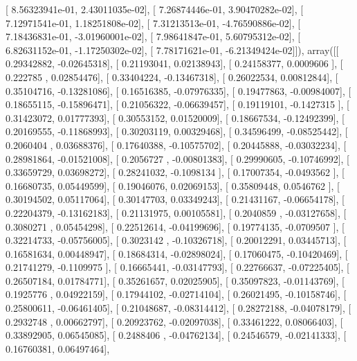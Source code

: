 \documentclass{article}
\begin{document}
       [  8.56323941e-01,   2.43011035e-02],
       [  7.26874446e-01,   3.90470282e-02],
       [  7.12971541e-01,   1.18251808e-02],
       [  7.31213513e-01,  -4.76590886e-02],
       [  7.18436831e-01,  -3.01960001e-02],
       [  7.98641847e-01,   5.60795312e-02],
       [  6.82631152e-01,  -1.17250302e-02],
       [  7.78171621e-01,  -6.21349424e-02]]), array([[ 0.29342882, -0.02645318],
       [ 0.21193041,  0.02138943],
       [ 0.24158377,  0.0009606 ],
       [ 0.222785  ,  0.02854476],
       [ 0.33404224, -0.13467318],
       [ 0.26022534,  0.00812844],
       [ 0.35104716, -0.13281086],
       [ 0.16516385, -0.07976335],
       [ 0.19477863, -0.00984007],
       [ 0.18655115, -0.15896471],
       [ 0.21056322, -0.06639457],
       [ 0.19119101, -0.1427315 ],
       [ 0.31423072,  0.01777393],
       [ 0.30553152,  0.01520009],
       [ 0.18667534, -0.12492399],
       [ 0.20169555, -0.11868993],
       [ 0.30203119,  0.00329468],
       [ 0.34596499, -0.08525442],
       [ 0.2060404 ,  0.03688376],
       [ 0.17640388, -0.10575702],
       [ 0.20445888, -0.03032234],
       [ 0.28981864, -0.01521008],
       [ 0.2056727 , -0.00801383],
       [ 0.29990605, -0.10746992],
       [ 0.33659729,  0.03698272],
       [ 0.28241032, -0.1098134 ],
       [ 0.17007354, -0.0493562 ],
       [ 0.16680735,  0.05449599],
       [ 0.19046076,  0.02069153],
       [ 0.35809448,  0.0546762 ],
       [ 0.30194502,  0.05117064],
       [ 0.30147703,  0.03349243],
       [ 0.21431167, -0.06654178],
       [ 0.22204379, -0.13162183],
       [ 0.21131975,  0.00105581],
       [ 0.2040859 , -0.03127658],
       [ 0.3080271 ,  0.05454298],
       [ 0.22512614, -0.04199696],
       [ 0.19774135, -0.0709507 ],
       [ 0.32214733, -0.05756005],
       [ 0.3023142 , -0.10326718],
       [ 0.20012291,  0.03445713],
       [ 0.16581634,  0.00448947],
       [ 0.18684314, -0.02898024],
       [ 0.17060475, -0.10420469],
       [ 0.21741279, -0.1109975 ],
       [ 0.16665441, -0.03147793],
       [ 0.22766637, -0.07225405],
       [ 0.26507184,  0.01784771],
       [ 0.35261657,  0.02025905],
       [ 0.35097823, -0.01143769],
       [ 0.1925776 ,  0.04922159],
       [ 0.17944102, -0.02714104],
       [ 0.26021495, -0.10158746],
       [ 0.25800611, -0.06461405],
       [ 0.21048687, -0.08314412],
       [ 0.28272188, -0.04078179],
       [ 0.2932748 ,  0.00662797],
       [ 0.20923762, -0.02097038],
       [ 0.33461222,  0.08066403],
       [ 0.33892905,  0.06545085],
       [ 0.2488406 , -0.04762134],
       [ 0.24546579, -0.02141333],
       [ 0.16760381,  0.06497464],
\end{document}
